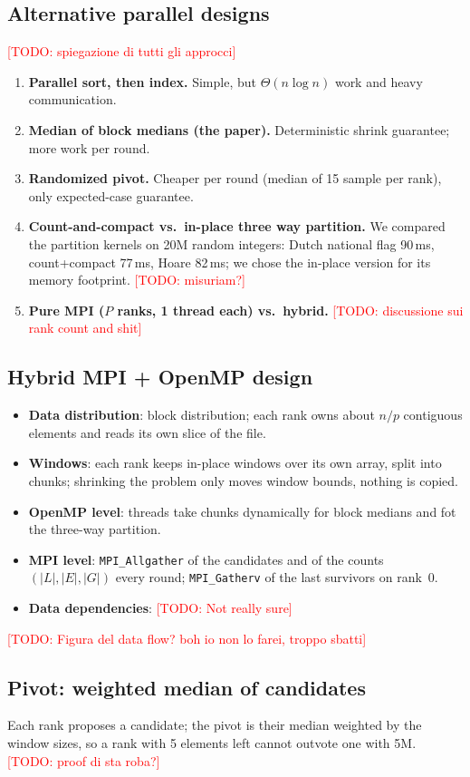 \documentclass[11pt, titlepage]{article}
\newcommand{\TODO}[1]{\textcolor{red}{[TODO: #1]}}
\begin{document}
\subsection{Alternative parallel designs}\label{sec:design:alt}
\TODO{spiegazione di tutti gli approcci}
\begin{enumerate}
\item \textbf{Parallel sort, then index.} Simple, but $\Theta(n\log n)$ work and heavy communication.
\item \textbf{Median of block medians (the paper).} Deterministic shrink guarantee; more work per round.
\item \textbf{Randomized pivot.} Cheaper per round (median of 15 sample per rank), only expected-case guarantee.
\item \textbf{Count-and-compact vs.\ in-place three way partition.} We compared the partition kernels on 20M random integers: Dutch national flag 90\,ms, count+compact 77\,ms, Hoare 82\,ms; we chose the in-place version for its memory footprint. \TODO{misuriam?}
\item \textbf{Pure MPI ($P$ ranks, 1 thread each) vs.\ hybrid.} \TODO{discussione sui rank count and shit}
\end{enumerate}

\subsection{Hybrid MPI + OpenMP design}\label{sec:design:hybrid}
\begin{itemize}
\item \textbf{Data distribution}: block distribution; each rank owns about $n/p$ contiguous elements and reads its own slice of the file.
\item \textbf{Windows}: each rank keeps in-place windows over its own array, split into chunks; shrinking the problem only moves window bounds, nothing is copied.
\item \textbf{OpenMP level}: threads take chunks dynamically for block medians and fot the three-way partition.
\item \textbf{MPI level}: \texttt{MPI\_Allgather} of the candidates and of the counts $(|L|,|E|,|G|)$ every round; \texttt{MPI\_Gatherv} of the last survivors on rank~0.
\item \textbf{Data dependencies}: \TODO{Not really sure}
\end{itemize}
\TODO{Figura del data flow? boh io non lo farei, troppo sbatti}

\subsection{Pivot: weighted median of candidates}
Each rank proposes a candidate; the pivot is their median weighted by the window sizes, so a rank with 5 elements left cannot outvote one with 5M.
\TODO{proof di sta roba?}
\end{document}
